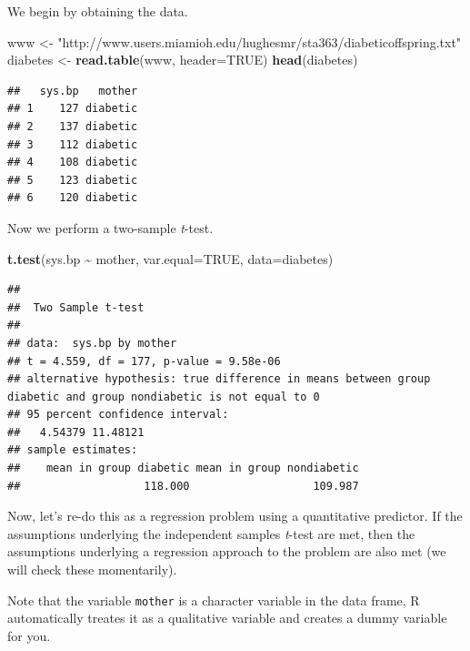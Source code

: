\documentclass[
]{book}
\newenvironment{Shaded}{\begin{snugshade}}{\end{snugshade}}
\newcommand{\AttributeTok}[1]{\textcolor[rgb]{0.13,0.29,0.53}{#1}}
\newcommand{\ConstantTok}[1]{\textcolor[rgb]{0.56,0.35,0.01}{#1}}
\newcommand{\FunctionTok}[1]{\textcolor[rgb]{0.13,0.29,0.53}{\textbf{#1}}}
\newcommand{\NormalTok}[1]{#1}
\newcommand{\OtherTok}[1]{\textcolor[rgb]{0.56,0.35,0.01}{#1}}
\newcommand{\SpecialCharTok}[1]{\textcolor[rgb]{0.81,0.36,0.00}{\textbf{#1}}}
\newcommand{\StringTok}[1]{\textcolor[rgb]{0.31,0.60,0.02}{#1}}
\begin{document}
We begin by obtaining the data.

\begin{Shaded}
\begin{Highlighting}[]
\NormalTok{www }\OtherTok{\textless{}{-}} \StringTok{"http://www.users.miamioh.edu/hughesmr/sta363/diabeticoffspring.txt"}
\NormalTok{diabetes }\OtherTok{\textless{}{-}} \FunctionTok{read.table}\NormalTok{(www, }\AttributeTok{header=}\ConstantTok{TRUE}\NormalTok{)}
\FunctionTok{head}\NormalTok{(diabetes)}
\end{Highlighting}
\end{Shaded}

\begin{verbatim}
##   sys.bp   mother
## 1    127 diabetic
## 2    137 diabetic
## 3    112 diabetic
## 4    108 diabetic
## 5    123 diabetic
## 6    120 diabetic
\end{verbatim}

Now we perform a two-sample \emph{t}-test.

\begin{Shaded}
\begin{Highlighting}[]
\FunctionTok{t.test}\NormalTok{(sys.bp }\SpecialCharTok{\textasciitilde{}}\NormalTok{ mother, }\AttributeTok{var.equal=}\ConstantTok{TRUE}\NormalTok{, }\AttributeTok{data=}\NormalTok{diabetes)}
\end{Highlighting}
\end{Shaded}

\begin{verbatim}
## 
##  Two Sample t-test
## 
## data:  sys.bp by mother
## t = 4.559, df = 177, p-value = 9.58e-06
## alternative hypothesis: true difference in means between group diabetic and group nondiabetic is not equal to 0
## 95 percent confidence interval:
##   4.54379 11.48121
## sample estimates:
##    mean in group diabetic mean in group nondiabetic 
##                   118.000                   109.987
\end{verbatim}

Now, let's re-do this as a regression problem using a quantitative predictor. If the assumptions underlying the independent samples \emph{t}-test are met, then the assumptions underlying a regression approach to the problem are also met (we will check these momentarily).

Note that the variable \texttt{mother} is a character variable in the data frame, R automatically treates it as a qualitative variable and creates a dummy variable for you.

\begin{Shaded}
\end{Shaded}
\end{document}
